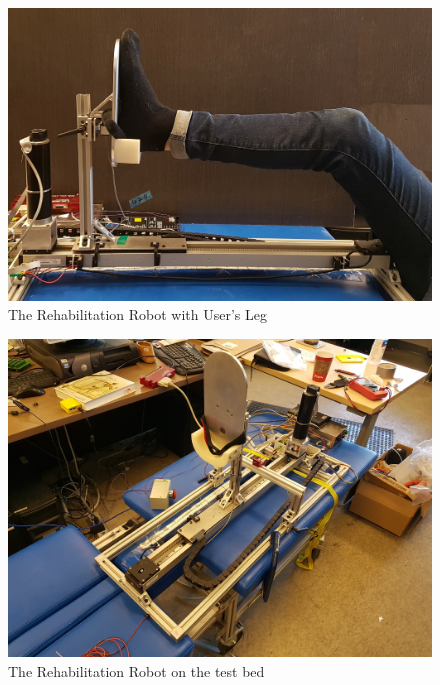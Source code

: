 \documentclass[12pt]{report}
\begin{document}
	\begin{figure}[h] 
		\centering
		\includegraphics[width=0.75\linewidth]{robot_leg}
		\caption{The Rehabilitation Robot with User's Leg}
		\label{fig:robot_leg}
	\end{figure}
	
	\begin{figure}[h] 
		\centering
		\includegraphics[width=0.75\linewidth]{device_on_bed}
		\caption{The Rehabilitation Robot on the test bed}
		\label{fig:robot_on_bed}
	\end{figure}
\end{document}
